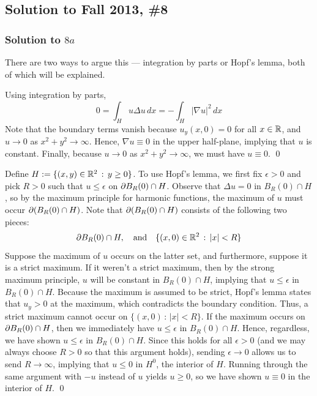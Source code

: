 \subsection*{Solution to Fall 2013, \#8}
\label{F13Q8}

\subsubsection*{Solution to $8a$}

There are two ways to argue this --- integration by parts or Hopf's lemma, both of which will be explained.

Using integration by parts,
$$ 0 = \int_H u \Delta u \, dx = -\int_H |\nabla u|^2 \, dx $$
Note that the boundary terms vanish because $u_y(x,0) = 0$ for all $x \in \mathbb{R}$, and $u \to 0$ as $x^2 + y^2 \to \infty$. Hence, $\nabla u \equiv 0$ in the upper half-plane, implying that $u$ is constant. Finally, because $u \to 0$ as $x^2 + y^2 \to \infty$, we must have $u \equiv 0$. \hfill \qed

\vspace{0.2cm}

Define $H := \{(x,y) \in \mathbb{R}^2 \, : \, y \geq 0 \}$. To use Hopf's lemma, we first fix $\epsilon > 0$ and pick $R > 0$ such that $u \leq \epsilon$ on $\partial B_R(0) \cap H$. Observe that $\Delta u = 0$ in $B_R(0) \cap H$, so by the maximum principle for harmonic functions, the maximum of $u$ must occur $\partial (B_R(0) \cap H)$. Note that $\partial (B_R(0) \cap H)$ consists of the following two pieces:
$$\partial B_R(0) \cap H, \quad \text{and} \quad \{ (x,0) \in \mathbb{R}^2 \, : \, |x| < R \}$$
Suppose the maximum of $u$ occurs on the latter set, and furthermore, suppose it is a strict maximum. If it weren't a strict maximum, then by the strong maximum principle, $u$ will be constant in $B_R(0) \cap H$, implying that $u \leq \epsilon$ in $B_R(0) \cap H$. Because the maximum is assumed to be strict, Hopf's lemma states that $u_y > 0$ at the maximum, which contradicts the boundary condition. Thus, a strict maximum cannot occur on $\{(x,0) \, : \, |x| < R \}$. If the maximum occurs on $\partial B_R(0) \cap H$, then we immediately have $u \leq \epsilon$ in $B_R(0) \cap H$. Hence, regardless, we have shown $u \leq \epsilon$ in $B_R(0) \cap H$. Since this holds for all $\epsilon > 0$ (and we may always choose $R>0$ so that this argument holds), sending $\epsilon \to 0$ allows us to send $R \to \infty$, implying that $u \leq 0$ in $H^0$, the interior of $H$. Running through the same argument with $-u$ instead of $u$ yields $u \geq 0$, so we have shown $u \equiv 0$ in the interior of $H$. \hfill \qed

